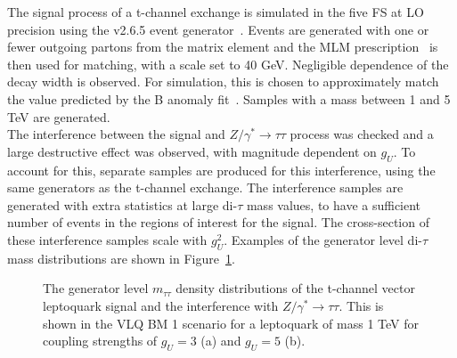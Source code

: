 The signal process of a t-channel exchange is simulated in the five \ac{FS} at \ac{LO} precision using the \MGvATNLO v2.6.5 event generator~\cite{Alwall:2011uj}.
Events are generated with one or fewer outgoing partons from the matrix element and the MLM prescription~\cite{Frederix:2012ps} is then used for matching, with a scale set to 40 GeV.
Negligible dependence of the decay width is observed. 
For simulation, this is chosen to approximately match the value predicted by the B anomaly fit~\cite{Cornella:2021sby}.
Samples with a mass between 1 and 5 TeV are generated. \\

The interference between the signal and $Z/\gamma^* \rightarrow \tau\tau$ process was checked and a large destructive effect was observed, with magnitude dependent on $g_{U}$.
To account for this, separate samples are produced for this interference, using the same generators as the t-channel exchange.
The interference samples are generated with extra statistics at large di-$\tau$ mass values, to have a sufficient number of events in the regions of interest for the signal.
The cross-section of these interference samples scale with $g_{U}^2$. 
Examples of the generator level di-$\tau$ mass distributions are shown in Figure~\ref{fig:vlq_signal}. \\

\begin{figure}[!hbtp]
\centering
\caption{The generator level $m_{\tau\tau}$ density distributions of the t-channel vector leptoquark signal and the interference with $Z/\gamma^* \rightarrow \tau\tau$. This is shown in the VLQ BM 1 scenario for a leptoquark of mass 1 TeV for coupling strengths of $g_{U}=3$ (a) and $g_{U}=5$ (b).}
\label{fig:vlq_signal}
\end{figure}

